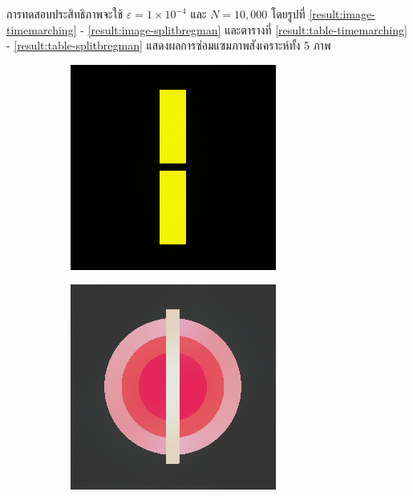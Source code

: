 \documentclass[hidelinks, a4paper,12pt]{article}
\numberwithin{equation}{section}							%
\numberwithin{equation}{section}
\begin{document}
{	\hspace{1cm}
	การทดสอบประสิทธิภาพจะใช้ $\varepsilon = 1 \times 10^{-4}$ และ $N= 10,000$ โดยรูปที่ \ref{result:image-timemarching} - \ref{result:image-splitbregman} และตารางที่ \ref{result:table-timemarching} - \ref{result:table-splitbregman} แสดงผลการซ่อมแซมภาพสังเคราะห์ทั้ง 5 ภาพ
	\begin{figure}[H]
		\centering
		\begin{subfigure}{0.4\linewidth}
			\centering
			\includegraphics[width=0.8\linewidth]{images/result_ex1/timemarch01.png}
		\end{subfigure}
		\begin{subfigure}{0.4\linewidth}
			\centering
			\includegraphics[width=0.8\linewidth]{images/result_ex1/timemarch02.png}

\end{subfigure}
\end{figure}}
\end{document}

